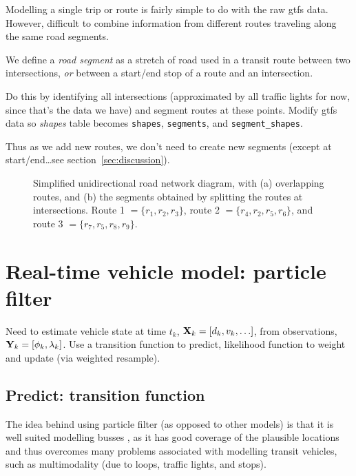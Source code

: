 \documentclass[draftcls,a4paper,onecolumn]{IEEEtran}\usepackage[]{graphicx}\usepackage[]{color}
\newenvironment{knitrout}{}{} %
\begin{document}
Modelling a single trip or route is fairly simple to do with the raw \gls{gtfs} data.
However, difficult to combine information from different routes traveling along the same road segments.

We define a \emph{road segment} as a stretch of road used in a transit route between two intersections,
\emph{or} between a start/end stop of a route and an intersection.

Do this by identifying all intersections
(approximated by all traffic lights for now, since that's the data we have)
and segment routes at these points.
Modify \gls{gtfs} data so \emph{shapes} table becomes
\texttt{shapes}, \texttt{segments}, and \texttt{segment\_shapes}.

Thus as we add new routes, we don't need to create new segments
(except at start/end\ldots see section~\ref{sec:discussion}).


\begin{knitrout}
\color{fgcolor}\begin{figure}
\caption[Simplied diagram of overlapping routes]{Simplified unidirectional road network diagram, with (a) overlapping routes, and (b) the segments obtained by splitting the routes at intersections. Route 1 $ = \{r_1, r_2, r_3\}$, route 2 $=\{r_4,r_2,r_5,r_6\}$, and route 3 $=\{r_7,r_5,r_8,r_9\}$.}\label{fig:route_segmentation}
\end{figure}


\end{knitrout}



\section{Real-time vehicle model: particle filter}
\label{sec:pf}

Need to estimate vehicle state at time $t_k$, $\mathbf{X}_k = [d_k, v_k, \ldots]$, 
from observations, $\mathbf{Y}_k = [\phi_k, \lambda_k]$.
Use a transition function to predict,
likelihood function to weight and update (via weighted resample).


\subsection{Predict: transition function}
The idea behind using particle filter (as opposed to other models)
is that it is well suited modelling busses \cite{Hans2015},
as it has good coverage of the plausible locations and thus overcomes
many problems associated with modelling transit vehicles,
such as multimodality (due to loops, traffic lights, and stops).
\end{document}
